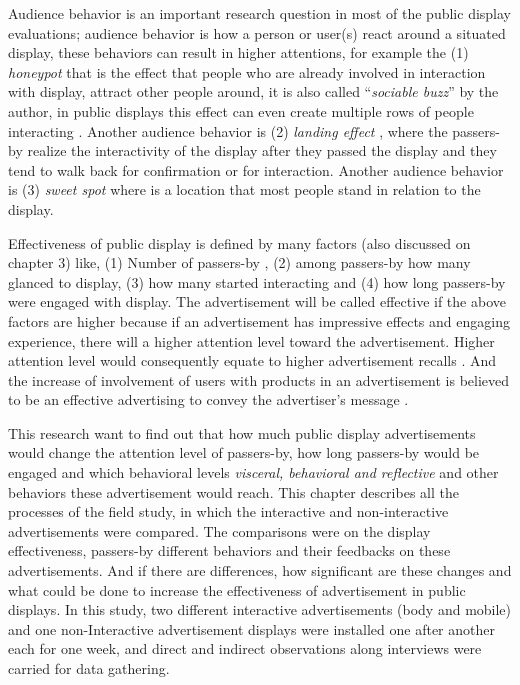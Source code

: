 Audience behavior is an important research question in most of the public display evaluations; audience behavior is how a person or user(s) react around a situated display, these behaviors can result in higher attentions, for example the (1) \emph{honeypot} \cite{EnticingPeople} that is the effect that people who are already involved in interaction with display, attract other people around, it is also called ``\emph{sociable buzz}'' by the author, in public displays this effect can even create multiple rows of people interacting \cite{LookingGlass}. Another audience behavior is (2) \emph{landing effect} \cite{LookingGlass}, where the passers-by realize the interactivity of the display after they passed the display and they tend to walk back for confirmation or for interaction. Another audience behavior is (3) \emph {sweet spot} \cite{CylindricalScreen} where is a location that most people stand in relation to the display. 


Effectiveness of public display is defined by many factors (also discussed on chapter 3) like, (1) Number of passers-by \cite{glancingcount, digitalSignage}, (2) among passers-by how many glanced \cite{glancingcount, When_display, display_blindness} to display, (3) how many started interacting \cite{LookingGlass, glancingcount} and (4) how long passers-by were engaged with display. The advertisement will be called effective if the above factors are higher because if an advertisement has impressive effects and engaging experience, there will a higher attention level toward the advertisement. Higher attention level would consequently equate to higher advertisement recalls \cite{add_effectivenss}. And the increase of involvement of users with products in an advertisement is believed to be an effective advertising to convey the advertiser’s message \cite{audience_involvement}.  

This research want to find out that how much public display advertisements would change the attention level of passers-by, how long passers-by would be engaged and which behavioral levels \emph{visceral, behavioral and reflective } and other behaviors these advertisement would reach. This chapter describes all the processes of the field study, in which the interactive and non-interactive advertisements were compared. The comparisons were on the display effectiveness, passers-by different behaviors and their feedbacks on these advertisements. And if there are differences, how significant are these changes and what could be done to increase the effectiveness of advertisement in public displays.  In this study, two different interactive advertisements (body and mobile) and one non-Interactive advertisement displays were installed one after another each for one week, and direct and indirect observations along interviews were carried for data gathering.



